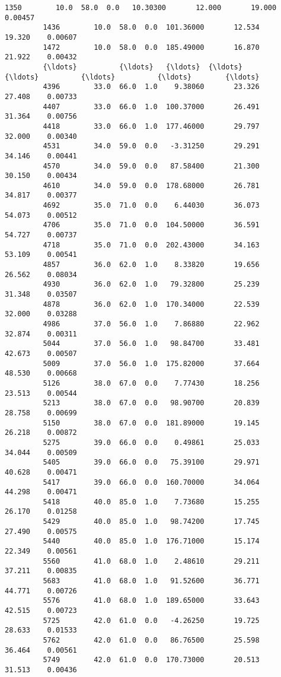 \documentclass[11pt]{article}
\begin{document}
\begin{Verbatim}[commandchars=\\\{\}]
         1350        10.0  58.0  0.0   10.30300       12.000       19.000    0.00457   
         1436        10.0  58.0  0.0  101.36000       12.534       19.320    0.00607   
         1472        10.0  58.0  0.0  185.49000       16.870       21.922    0.00432   
         {\ldots}          {\ldots}   {\ldots}  {\ldots}        {\ldots}          {\ldots}          {\ldots}        {\ldots}   
         4396        33.0  66.0  1.0    9.38060       23.326       27.408    0.00733   
         4407        33.0  66.0  1.0  100.37000       26.491       31.364    0.00756   
         4418        33.0  66.0  1.0  177.46000       29.797       32.000    0.00340   
         4531        34.0  59.0  0.0   -3.31250       29.291       34.146    0.00441   
         4570        34.0  59.0  0.0   87.58400       21.300       30.150    0.00434   
         4610        34.0  59.0  0.0  178.68000       26.781       34.817    0.00377   
         4692        35.0  71.0  0.0    6.44030       36.073       54.073    0.00512   
         4706        35.0  71.0  0.0  104.50000       36.591       54.727    0.00737   
         4718        35.0  71.0  0.0  202.43000       34.163       53.109    0.00541   
         4857        36.0  62.0  1.0    8.33820       19.656       26.562    0.08034   
         4930        36.0  62.0  1.0   79.32800       25.239       31.348    0.03507   
         4878        36.0  62.0  1.0  170.34000       22.539       32.000    0.03288   
         4986        37.0  56.0  1.0    7.86880       22.962       32.874    0.00311   
         5044        37.0  56.0  1.0   98.84700       33.481       42.673    0.00507   
         5009        37.0  56.0  1.0  175.82000       37.664       48.530    0.00668   
         5126        38.0  67.0  0.0    7.77430       18.256       23.513    0.00544   
         5213        38.0  67.0  0.0   98.90700       20.839       28.758    0.00699   
         5150        38.0  67.0  0.0  181.89000       19.145       26.218    0.00872   
         5275        39.0  66.0  0.0    0.49861       25.033       34.044    0.00509   
         5405        39.0  66.0  0.0   75.39100       29.971       40.628    0.00471   
         5417        39.0  66.0  0.0  160.70000       34.064       44.298    0.00471   
         5418        40.0  85.0  1.0    7.73680       15.255       26.170    0.01258   
         5429        40.0  85.0  1.0   98.74200       17.745       27.490    0.00575   
         5440        40.0  85.0  1.0  176.71000       15.174       22.349    0.00561   
         5560        41.0  68.0  1.0    2.48610       29.211       37.211    0.00835   
         5683        41.0  68.0  1.0   91.52600       36.771       44.771    0.00726   
         5576        41.0  68.0  1.0  189.65000       33.643       42.515    0.00723   
         5725        42.0  61.0  0.0   -4.26250       19.725       28.633    0.01533   
         5762        42.0  61.0  0.0   86.76500       25.598       36.464    0.00561   
         5749        42.0  61.0  0.0  170.73000       20.513       31.513    0.00436   
         

\end{Verbatim}
\end{document}
